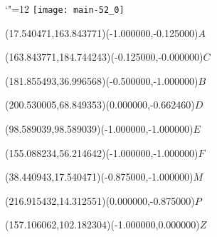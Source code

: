 \documentclass[12pt]{article}
\begin{document}
\makeatletter%
\let\ASYencoding\f@encoding%
\let\ASYfamily\f@family%
\let\ASYseries\f@series%
\let\ASYshape\f@shape%
\makeatother%
{\catcode`"=12%
\texttt{[image: main-52\_0]}%
}%
\kern -227.622047pt%
%
%
\fontsize{12.000000}{14.400000}\selectfont%
\usefont{\ASYencoding}{\ASYfamily}{\ASYseries}{\ASYshape}%
\ASYalign(17.540471,163.843771)(-1.000000,-0.125000){$A$}%
%
%
\fontsize{12.000000}{14.400000}\selectfont%
\ASYalign(163.843771,184.744243)(-0.125000,-0.000000){$C$}%
%
%
\fontsize{12.000000}{14.400000}\selectfont%
\ASYalign(181.855493,36.996568)(-0.500000,-1.000000){$B$}%
%
%
\fontsize{12.000000}{14.400000}\selectfont%
\ASYalign(200.530005,68.849353)(0.000000,-0.662460){$D$}%
%
%
\fontsize{12.000000}{14.400000}\selectfont%
\ASYalign(98.589039,98.589039)(-1.000000,-1.000000){$E$}%
%
%
\fontsize{12.000000}{14.400000}\selectfont%
\ASYalign(155.088234,56.214642)(-1.000000,-1.000000){$F$}%
%
%
\fontsize{12.000000}{14.400000}\selectfont%
\ASYalign(38.440943,17.540471)(-0.875000,-1.000000){$M$}%
%
%
\fontsize{12.000000}{14.400000}\selectfont%
\ASYalign(216.915432,14.312551)(0.000000,-0.875000){$P$}%
%
%
\fontsize{12.000000}{14.400000}\selectfont%
\ASYalign(157.106062,102.182304)(-1.000000,0.000000){$Z$}%
\end{document}
